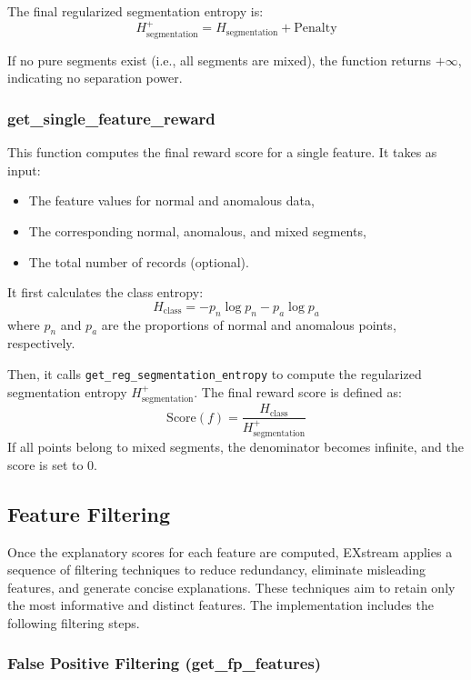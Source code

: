 \documentclass[11pt]{article}
\begin{document}
The final regularized segmentation entropy is:
\[
H^+_{\text{segmentation}} = H_{\text{segmentation}} + \text{Penalty}
\]

If no pure segments exist (i.e., all segments are mixed), the function returns \( +\infty \), indicating no separation power.





\subsubsection{get\_single\_feature\_reward}

This function computes the final reward score for a single feature. It takes as input:
\begin{itemize}
  \item The feature values for normal and anomalous data,
  \item The corresponding normal, anomalous, and mixed segments,
  \item The total number of records (optional).
\end{itemize}

It first calculates the class entropy:
\[
H_{\text{class}} = -p_n \log p_n - p_a \log p_a
\]
where \( p_n \) and \( p_a \) are the proportions of normal and anomalous points, respectively.

Then, it calls \texttt{get\_reg\_segmentation\_entropy} to compute the regularized segmentation entropy \( H^+_{\text{segmentation}} \). The final reward score is defined as:
\[
\text{Score}(f) = \frac{H_{\text{class}}}{H^+_{\text{segmentation}}}
\]
If all points belong to mixed segments, the denominator becomes infinite, and the score is set to 0.
\subsection{Feature Filtering}

Once the explanatory scores for each feature are computed, EXstream applies a sequence of filtering techniques to reduce redundancy, eliminate misleading features, and generate concise explanations. These techniques aim to retain only the most informative and distinct features. The implementation includes the following filtering steps.






\subsubsection{False Positive Filtering (get\_fp\_features)}
\end{document}
